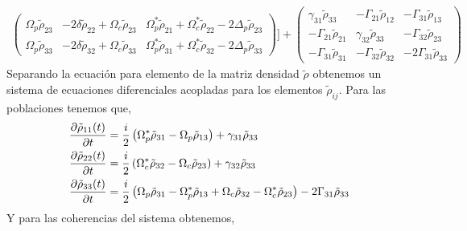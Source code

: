 \begin{equation}
\begin{split}
\begin{pmatrix}
            \Omega_p \tilde{\rho}_{23} & - 2 \delta \tilde{\rho}_{22} + \Omega_c \tilde{\rho}_{23} & 
            \Omega_p^* \tilde{\rho}_{21} + \Omega_c^* \tilde{\rho}_{22} - 2 \Delta_p \tilde{\rho}_{23}\\
            \Omega_p \tilde{\rho}_{33} & - 2 \delta \tilde{\rho}_{32} + \Omega_c \tilde{\rho}_{33} & 
            \Omega_p^* \tilde{\rho}_{31} + \Omega_c^* \tilde{\rho}_{32} - 2 \Delta_p \tilde{\rho}_{33}
        \end{pmatrix} 
    ]  + \begin{pmatrix} 
         \gamma_{31} \tilde{\rho}_{33} & -\Gamma_{21} \tilde{\rho}_{12} & -\Gamma_{31} \tilde{\rho}_{13} \\ 
        -\Gamma_{21} \tilde{\rho}_{21} & \gamma_{32} \tilde{\rho}_{33} & -\Gamma_{32} \tilde{\rho}_{23} \\ 
        -\Gamma_{31} \tilde{\rho}_{31} & -\Gamma_{32} \tilde{\rho}_{32} & - 2 \Gamma_{31} \tilde{\rho}_{33} 
        \end{pmatrix}
\end{split}
\end{equation}
Separando la ecuación para elemento de la matriz densidad $\tilde{\rho}$ obtenemos un sistema de ecuaciones diferenciales acopladas para los elementos $\tilde{\rho}_{ij}$. Para las poblaciones tenemos que,
\begin{equation}
    \begin{split}
        \pdv{\tilde{\rho}_{11}(t)}{t} &= \frac{i}{2} \left(  \Omega_p^* \tilde{\rho}_{31} -\Omega_p \tilde{\rho}_{13} \right) + \gamma_{31} \tilde{\rho}_{33} \\
        \pdv{\tilde{\rho}_{22}(t)}{t} &= \frac{i}{2} \left(\Omega_c^* \tilde{\rho}_{32} - \Omega_c \tilde{\rho}_{23} \right) + \gamma_{32} \tilde{\rho}_{33} \\
        \pdv{\tilde{\rho}_{33}(t)}{t} &= \frac{i}{2} \left( \Omega_p \tilde{\rho}_{31}  -\Omega_p^* \tilde{\rho}_{13} + \Omega_c \tilde{\rho}_{32} - \Omega_c^* \tilde{\rho}_{23}\right) - 2 \Gamma_{31} \tilde{\rho}_{33}  
    \end{split}
\end{equation} 
Y para las coherencias del sistema obtenemos,
